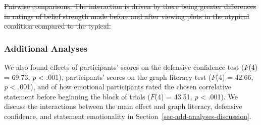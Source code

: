\documentclass[manuscript,screen,review,anonymous]{acmart}
\providecommand{\DIFdeltex}[1]{{\protect\color{red}\sout{#1}}} %
\providecommand{\DIFdelbegin}{} %
\providecommand{\DIFdelend}{} %
\providecommand{\DIFdelFL}[1]{\DIFdel{#1}} %
\providecommand{\DIFdel}[1]{\texorpdfstring{\DIFdeltex{#1}}{}} %
\newcommand{\DIFscaledelfig}{0.5}
\newlength{\DIFdelgraphicswidth} %
\newlength{\DIFdelgraphicsheight} %
\newcommand{\DIFdelincludegraphics}[2][]{%
\sbox{\DIFdelgraphicsbox}{\DIFOincludegraphics[#1]{#2}}%
\settoboxwidth{\DIFdelgraphicswidth}{\DIFdelgraphicsbox} %
\settoboxtotalheight{\DIFdelgraphicsheight}{\DIFdelgraphicsbox} %
\scalebox{\DIFscaledelfig}{%
\parbox[b]{\DIFdelgraphicswidth}{\usebox{\DIFdelgraphicsbox}\\[-\baselineskip] \rule{\DIFdelgraphicswidth}{0em}}\llap{\resizebox{\DIFdelgraphicswidth}{\DIFdelgraphicsheight}{%
\setlength{\unitlength}{\DIFdelgraphicswidth}%
\begin{picture}(1,1)%
\thicklines\linethickness{2pt} %
{\color[rgb]{1,0,0}\put(0,0){\framebox(1,1){}}}%
{\color[rgb]{1,0,0}\put(0,0){\line( 1,1){1}}}%
{\color[rgb]{1,0,0}\put(0,1){\line(1,-1){1}}}%
\end{picture}%
}\hspace*{3pt}}} %
} %
\DeclareRobustCommand{\DIFdelbegin}{\DIFOdelbegin \let\includegraphics\DIFdelincludegraphics} %
\DeclareRobustCommand{\DIFdelend}{\DIFOaddend \let\includegraphics\DIFOincludegraphics} %
\begin{document}
\DIFdelbegin %

{%
\DIFdelFL{Pairwise comparisons. The interaction is
driven by there being greater differences in ratings of belief strength
made before and after viewing plots in the atypical condition compared
to the typical.}}





\DIFdelend \subsubsection{Additional Analyses}\label{sec-add-analyses}

We also found effects of participants' scores on the defensive
confidence test (\(F\)(4) = 69.73, \emph{p} \textless{} .001),
participants' scores on the graph literacy test (\(F\)(4) = 42.66,
\emph{p} \textless{} .001), and of how emotional participants rated the
chosen correlative statement before beginning the block of trials
(\(F\)(4) = 43.51, \emph{p} \textless{} .001). We discuss the
interactions between the main effect and graph literacy, defensive
confidence, and statement emotionality in
Section~\ref{sec-add-analyses-discussion}.
\end{document}
